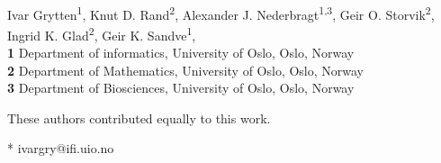 \documentclass[10pt,letterpaper]{article}
\begin{document}
\vspace*{0.2in}

\begin{flushleft}
{\Large
\textbf{} %
}
\newline
\\
Ivar Grytten\textsuperscript{1\Yinyang*},
Knut D. Rand\textsuperscript{2\Yinyang},
Alexander J. Nederbragt\textsuperscript{1,3},
Geir O. Storvik\textsuperscript{2},
Ingrid K. Glad\textsuperscript{2},
Geir K. Sandve\textsuperscript{1}, 
\\
\bigskip
\textbf{1} Department of informatics, University of Oslo, Oslo, Norway
\\
\textbf{2} Department of Mathematics, University of Oslo, Oslo, Norway
\\
\textbf{3} Department of Biosciences, University of Oslo, Oslo, Norway
\\
\bigskip

% 
%
\Yinyang These authors contributed equally to this work.





* ivargry@ifi.uio.no

\end{flushleft}
\end{document}
